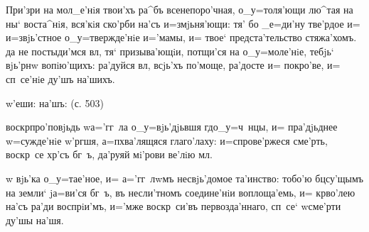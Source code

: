  При'зри на 
мол_е'нiя твои'хъ ра^бъ всенепоро'чная, о_у=толя'ющи 
лю^тая на ны` воста^нiя, вся'кiя ско'рби на'съ 
и=змjьня'ющи: тя' бо _е=ди'ну тве'рдое и= и=звjь'стное 
о_у=твержде'нiе и='мамы, и= твое` предста'тельство 
стяжа'хомъ. да не постыди'мся вл, тя` призыва'ющiи, 
потщи'ся на о_у=моле'нiе, тебjь` вjь'рнw вопiю'щихъ: 
ра'дуйся вл, всjь'хъ по'моще, ра'досте и= покро'ве, 
и= сп~се'нiе ду'шъ на'шихъ.

  w'еши:     на'шъ: (с. 503) 


 воскр про'повjьдь w\т а='гг~ла 
о_у=вjь'дjьвшя гд о_у=ч~нцы, и= пра'дjьднее 
w=сужде'нiе w'ргшя, а=п хва'лящяся глаго'лаху: 
и=спрове'ржеся сме'рть, воскр~се хр'съ бг~ъ, да'руяй 
мi'рови ве'лiю мл.

     w\т 
вjь'ка о_у=тае'ное, и= а='гг~лwмъ несвjь'домое та'инство: 
тобо'ю бц су'щымъ на земли` jа=ви'ся бг~ъ, въ 
несли'тномъ соедине'нiи воплоща'емь, и= кр во'лею 
на'съ ра'ди воспрiи'мъ, и='мже воскр~си'въ 
первозда'ннаго, сп~се` w\т сме'рти ду'шы на'шя.
